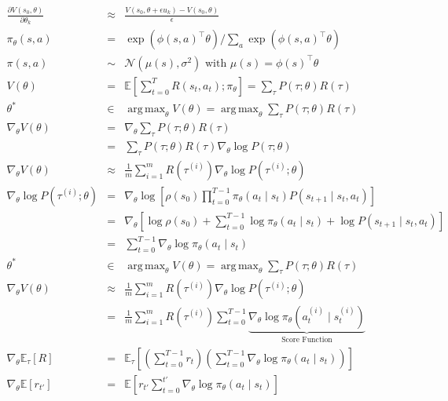 \documentclass[]{article}
\DeclareMathOperator*{\argmax}{arg\,max}
\begin{document}
\begin{eqnarray}
    \frac{\partial V(s_0, \theta)}{\partial \theta_k} &\approx& \frac{V(s_0, \theta + \epsilon u_k) - V(s_0, \theta)}{\epsilon}\\
    \pi_\theta (s,a) &=& \exp(\phi(s,a)^\intercal\theta) / \sum_{a} \exp(\phi(s,a)^\intercal\theta)\\
    \pi(s,a) &\sim& \mathcal{N}(\mu(s), \sigma^2) \text{ with }\mu(s) = \phi(s)^\intercal \theta\\
    V(\theta) &=& \mathbb{E}\left[\sum_{t=0}^T R(s_t, a_t); \pi_\theta \right] = \sum_{\tau} P(\tau; \theta)R(\tau) \\
    \theta^* &\in& \argmax_{\theta} V(\theta) = \argmax_{\theta}\sum_{\tau} P(\tau; \theta) R(\tau)\\
    \nabla_\theta V(\theta) &=& \nabla_\theta \sum_{\tau} P(\tau; \theta)R(\tau)\\
    &=& \sum_{\tau} P(\tau; \theta)  R(\tau) \nabla_\theta \log P(\tau; \theta)\\
    \nabla_\theta V(\theta) &\approx& \frac{1}{m} \sum_{i=1}^{m} R(\tau^{(i)}) \nabla_\theta \log P(\tau^{(i)}; \theta)\\
    \nabla_\theta \log P(\tau^{(i)}; \theta) &=& \nabla_\theta \log \left[ \rho(s_0) \prod_{t=0}^{T-1} \pi_\theta(a_t \mid s_t) P(s_{t+1} \mid s_t, a_t) \right]\\
    &=& \nabla_\theta \left[ \log \rho(s_0) + \sum_{t=0}^{T-1} \log \pi_\theta(a_t \mid s_t) + \log P(s_{t+1}\mid s_t, a_t) \right]\\
    &=& \sum_{t=0}^{T-1} \nabla_\theta \log \pi_\theta (a_t \mid s_t)\\
    \theta^* &\in& \argmax_{\theta} V(\theta) = \argmax_{\theta}\sum_{\tau} P(\tau; \theta) R(\tau)\\
    \nabla_\theta V(\theta) &\approx& \frac{1}{m} \sum_{i=1}^{m} R(\tau^{(i)}) \nabla_\theta \log P(\tau^{(i)}; \theta)\\
    &=& \frac{1}{m} \sum_{i=1}^{m} R(\tau^{(i)}) \sum_{t=0}^{T-1} \underbrace{\nabla_\theta \log \pi_\theta (a_t^{(i)} \mid s_t^{(i)})}_{\text{Score Function}}\\
    \nabla_\theta \mathbb{E}_\tau [R] &=& \mathbb{E}_\tau \left[ \left(\sum_{t=0}^{T-1} r_t\right) \left( \sum_{t=0}^{T-1} \nabla_\theta \log \pi_\theta(a_t \mid s_t) \right) \right]\\
    \nabla_\theta \mathbb{E} [r_{t'}] &=& \mathbb{E} \left[r_{t'} \sum_{t=0}^{t'} \nabla_\theta \log \pi_\theta (a_t \mid s_t)\right]\\

\end{eqnarray}
\end{document}
